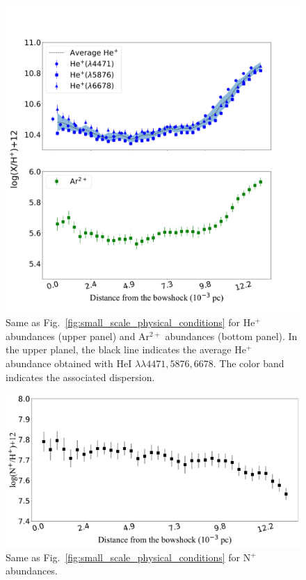 \documentclass[twocolumn,linenumbers]{aastex63}
\begin{document}
\begin{figure}
\centering
\includegraphics[width=\columnwidth]{He_Ar_abundances.pdf}
\caption{Same as Fig.~\ref{fig:small_scale_physical_conditions} for He$^{+}$ abundances (upper panel) and Ar$^{2+}$ abundances (bottom panel). In the upper planel, the black line indicates the average He$^{+}$ abundance obtained with He\thinspace I $\lambda \lambda 4471,5876,6678$. The color band indicates the associated dispersion.}
\label{fig:he_Ar_abundances}
\end{figure}

\begin{figure}
\centering
\includegraphics[width=\columnwidth]{N2_distribution.pdf}
\caption{Same as Fig.~\ref{fig:small_scale_physical_conditions} for N$^{+}$ abundances.}
\label{fig:N2_abundances}
\end{figure}
\end{document}
